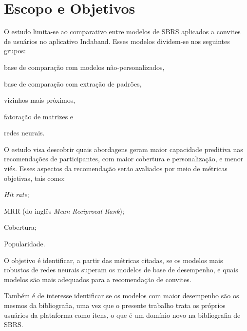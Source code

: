 \section{Escopo e Objetivos}

O estudo limita-se ao comparativo entre modelos de SBRS aplicados a convites de
usuários no aplicativo Indaband. Esses modelos dividem-se nos seguintes
grupos: 
\begin{inparaenum}[(1)]
  \item base de comparação com modelos não-personalizados,
  \item base de comparação com extração de padrões,
  \item vizinhos mais próximos,
  \item fatoração de matrizes e
  \item redes neurais.
\end{inparaenum}

O estudo visa descobrir quais abordagens geram maior capacidade preditiva nas
recomendações de participantes, com maior cobertura e personalização, e menor
viés. Esses aspectos da recomendação serão avaliados por meio de métricas
objetivas, tais como:
\begin{inparaenum}[(1)]
  \item \textit{Hit rate};
  \item MRR (do inglês \textit{Mean Reciprocal Rank});
  \item Cobertura;
  \item Popularidade.
\end{inparaenum}

O objetivo é identificar, a partir das métricas citadas, se os modelos mais
robustos de redes neurais superam os modelos de base de desempenho, e quais
modelos são mais adequados para a recomendação de convites.

Também é de interesse identificar se os modelos com maior desempenho são os
mesmos da bibliografia, uma vez que o presente trabalho trata os próprios
usuários da plataforma como itens, o que é um domínio novo na bibliografia de
SBRS.
